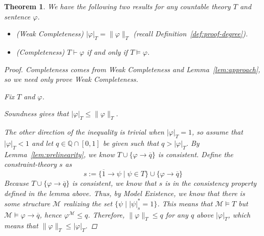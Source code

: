 \documentclass{amsart}
\newtheorem{theorem}{Theorem}[section]
\theoremstyle{definition}
\numberwithin{equation}{theorem}
\renewcommand{\phi}{\varphi}
\newcommand{\Q}{\mathbb{Q}}
\newcommand{\where}{\mid}
\newcommand{\proves}{\vdash}
\newcommand{\rat}[1]{{\overline{#1}}}
\newcommand{\narrow}[1]{\xrightarrow{#1}}
\renewcommand{\to}{\narrow{}}
\begin{document}
\begin{theorem}
  We have the following two results for any countable theory $T$ and sentence $\phi$.
  \begin{itemize}
  \item\emph{(Weak Completeness)} $|\phi|_T=\|\phi\|_T$ \emph{(recall Definition~\ref{def:proof-degree})}.
  \item\emph{(Completeness)} $T\proves\phi$ if and only if $T\models\phi$.
  \end{itemize}
  \begin{proof}
    Completeness comes from Weak Completeness and Lemma~\ref{lem:approach}, so we need only prove Weak Completeness.
  
    Fix $T$ and $\phi$.
	
	  Soundness gives that $|\phi|_T\leq\|\phi\|_T$.
	  
	  The other direction of the inequality is trivial when $|\phi|_T=1$, so assume that $|\phi|_T<1$ and let $q\in\Q\cap[0,1]$ be given such that $q>|\phi|_T$.
	  By Lemma~\ref{lem:prelinearity}, we know $T\cup\{\phi\to\rat q\}$ is consistent.
	  Define the constraint-theory $s$ as
	  \[
	    s:=\{\rat 1\to\psi\where \psi\in T\}\cup\{\phi\to\rat q\}
	  \]
	  Because $T\cup\{\phi\to\rat q\}$ is consistent, we know that $s$ is in the consistency property defined in the lemma above.
    Thus, by Model Existence, we know that there is some structure $\mathcal M$ realizing the set $\{\psi\where |\psi|^*_s=1\}$.
    This means that $\mathcal M\models T$ but $\mathcal M\models\phi\to\rat q$, hence $\phi^\mathcal M\leq q$.
    Therefore, $\|\phi\|_T\leq q$ for any $q$ above $|\phi|_T$, which means that $\|\phi\|_T\leq|\phi|_T$.
  \end{proof}
\end{theorem}
\end{document}
